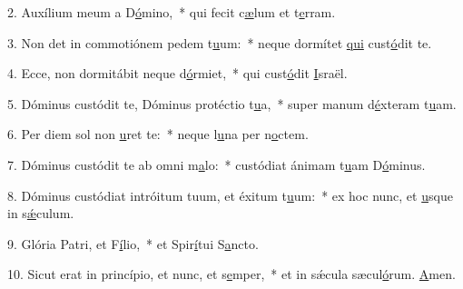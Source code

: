 2. Auxílium meum a D\uline{ó}mino,~* qui fecit c\uline{æ}lum et t\uline{e}rram.\par 
3. Non det in commotiónem pedem t\uline{u}um:~* neque dormítet \uline{qui} cust\uline{ó}dit te.\par 
4. Ecce, non dormitábit neque d\uline{ó}rmiet,~* qui cust\uline{ó}dit \uline{I}sraël.\par 
5. Dóminus custódit te, Dóminus protéctio t\uline{u}a,~* super manum d\uline{é}xteram t\uline{u}am.\par 
6. Per diem sol non \uline{u}ret te:~* neque l\uline{u}na per n\uline{o}ctem.\par 
7. Dóminus custódit te ab omni m\uline{a}lo:~* custódiat ánimam t\uline{u}am D\uline{ó}minus.\par 
8. Dóminus custódiat intróitum tuum, et éxitum t\uline{u}um:~* ex hoc nunc, et \uline{u}sque in s\uline{ǽ}culum.\par 
9. Glória Patri, et F\uline{í}lio,~* et Spir\uline{í}tui S\uline{a}ncto.\par 
10. Sicut erat in princípio, et nunc, et s\uline{e}mper,~* et in sǽcula sæcul\uline{ó}rum. \uline{A}men.\par 
